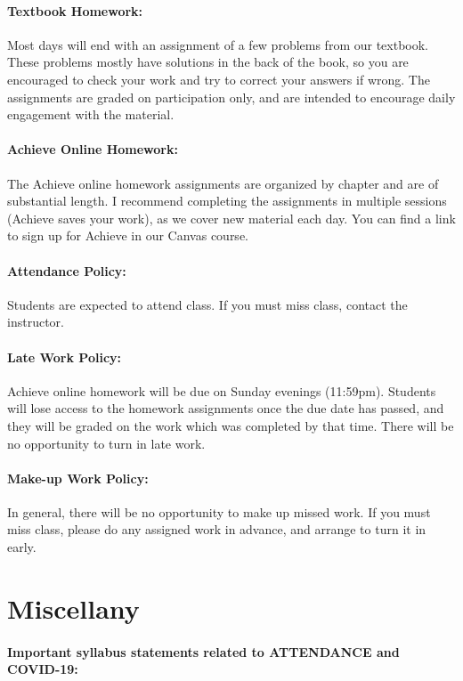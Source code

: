 \documentclass[12pt, letterpaper]{article}
\begin{document}
\paragraph{Textbook Homework:}
Most days will end with an assignment of a few problems from our textbook. These problems mostly have solutions in the back of the book, so you are encouraged to check your work and try to correct your answers if wrong. The assignments are graded on participation only, and are intended to encourage daily engagement with the material.

\paragraph{Achieve Online Homework:}
The Achieve online homework assignments are organized by chapter and are of substantial length. I recommend completing the assignments in multiple sessions (Achieve saves your work), as we cover new material each day. You can find a link to sign up for Achieve in our Canvas course.

\paragraph{Attendance Policy:}
Students are expected to attend class. If you must miss class, contact the instructor.

\paragraph{Late Work Policy:}
Achieve online homework will be due on Sunday evenings (11:59pm). Students will lose access to the homework assignments once the due date has passed, and they will be graded on the work which was completed by that time. There will be no opportunity to turn in late work.

\paragraph{Make-up Work Policy:}
In general, there will be no opportunity to make up missed work. If you must miss class, please do any assigned work in advance, and arrange to turn it in early.

\section*{Miscellany}

\paragraph{Important syllabus statements related to ATTENDANCE and COVID-19:} ~
\end{document}
